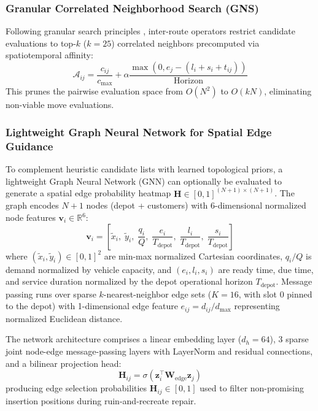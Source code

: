 \documentclass{ieeeaccess}
\begin{document}
\subsubsection{Granular Correlated Neighborhood Search (GNS)}
Following granular search principles \cite{toth2003granular}, inter-route operators restrict candidate evaluations to top-$k$ ($k=25$) correlated neighbors precomputed via spatiotemporal affinity:
\begin{equation}
  \mathcal{A}_{ij} = \frac{c_{ij}}{c_{\max}} + \alpha \frac{\max(0, e_j - (l_i + s_i + t_{ij}))}{\text{Horizon}}
  \label{eq:granular_affinity}
\end{equation}
This prunes the pairwise evaluation space from $O(N^2)$ to $O(k N)$, eliminating non-viable move evaluations.

\subsubsection{Lightweight Graph Neural Network for Spatial Edge Guidance}
\label{sec:gnn_guidance}
To complement heuristic candidate lists with learned topological priors, a lightweight Graph Neural Network (GNN) can optionally be evaluated to generate a spatial edge probability heatmap $\mathbf{H} \in [0, 1]^{(N+1)\times (N+1)}$. The graph encodes $N+1$ nodes (depot + customers) with 6-dimensional normalized node features $\mathbf{v}_i \in \mathbb{R}^6$:
\begin{equation}
  \mathbf{v}_i = \left[ \tilde{x}_i, \; \tilde{y}_i, \; \frac{q_i}{Q}, \; \frac{e_i}{T_{\text{depot}}}, \; \frac{l_i}{T_{\text{depot}}}, \; \frac{s_i}{T_{\text{depot}}} \right]
  \label{eq:gnn_node_feats}
\end{equation}
where $(\tilde{x}_i, \tilde{y}_i) \in [0, 1]^2$ are min-max normalized Cartesian coordinates, $q_i / Q$ is demand normalized by vehicle capacity, and $(e_i, l_i, s_i)$ are ready time, due time, and service duration normalized by the depot operational horizon $T_{\text{depot}}$. Message passing runs over sparse $k$-nearest-neighbor edge sets ($K=16$, with slot 0 pinned to the depot) with 1-dimensional edge feature $e_{ij} = d_{ij} / d_{\max}$ representing normalized Euclidean distance.

The network architecture comprises a linear embedding layer ($d_h = 64$), 3 sparse joint node-edge message-passing layers with LayerNorm and residual connections, and a bilinear projection head:
\begin{equation}
  \mathbf{H}_{ij} = \sigma\left( \mathbf{z}_i^{\top} \mathbf{W}_{\text{edge}} \mathbf{z}_j \right)
  \label{eq:gnn_bilinear_head}
\end{equation}
producing edge selection probabilities $\mathbf{H}_{ij} \in [0, 1]$ used to filter non-promising insertion positions during ruin-and-recreate repair.
\end{document}

